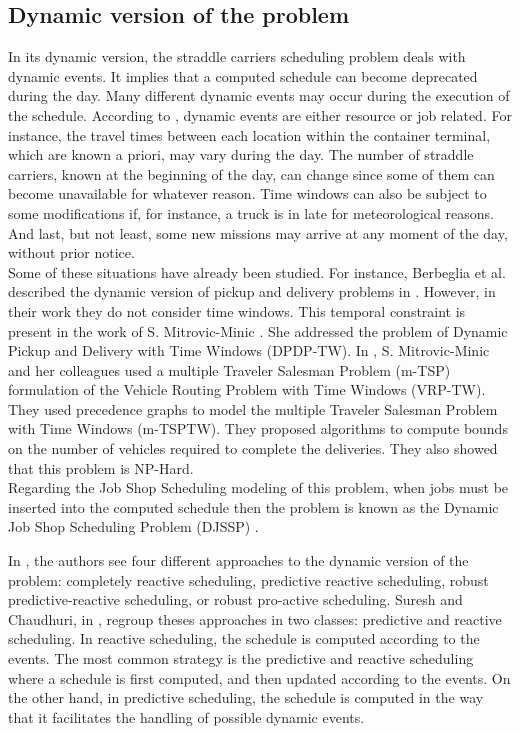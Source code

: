 \documentclass[a4paper,10pt]{article}
\begin{document}
\subsection{Dynamic version of the problem}\label{subsec:dynamic}

In its dynamic version, the straddle carriers scheduling problem deals with dynamic events. It implies that a computed schedule can become deprecated during the day. Many different dynamic events may occur during the execution of the schedule. According to \cite{Ouelhadj2009}, dynamic events are either resource or job related. For instance, the travel times between each location within the container terminal, which are known a priori, may vary during the day. The number of straddle carriers, known at the beginning of the day, can change since some of them can become unavailable for whatever reason. Time windows can also be subject to some modifications if, for instance, a truck is in late for meteorological reasons. And last, but not least, some new missions may arrive at any moment of the day, without prior notice.\\

Some of these situations have already been studied. For instance, Berbeglia et al. described the dynamic version of pickup and delivery problems in \cite{Berbeglia2010}. However, in their work they do not consider time windows. This temporal constraint is present in the work of S. Mitrovic-Minic \cite{Mitrovic2001}. She addressed the problem of Dynamic Pickup and Delivery with Time Windows (DPDP-TW). In \cite{Mitrovic2006}, S. Mitrovic-Minic and her colleagues used a multiple Traveler Salesman Problem (m-TSP) formulation of the Vehicle Routing Problem with Time Windows (VRP-TW). They used precedence graphs to model the multiple Traveler Salesman Problem with Time Windows (m-TSPTW). They proposed algorithms to compute bounds on the number of vehicles required to complete the deliveries. They also showed that this problem is NP-Hard.\\

Regarding the Job Shop Scheduling modeling of this problem, when jobs must be inserted into the computed schedule then the problem is known as the Dynamic Job Shop Scheduling Problem (DJSSP) \cite{Ramasesh1990}.

In \cite{Ouelhadj2009}, the authors see four different approaches to the dynamic version of the problem: completely reactive scheduling, predictive reactive scheduling, robust predictive-reactive scheduling, or robust pro-active scheduling. Suresh and Chaudhuri, in \cite{Suresh1993}, regroup theses approaches in two classes: predictive and reactive scheduling. In reactive scheduling, the schedule is computed according to the events. The most common strategy is the predictive and reactive scheduling where a schedule is first computed, and then updated according to the events. On the other hand, in predictive scheduling, the schedule is computed in the way that it facilitates the handling of possible dynamic events.
\end{document}
